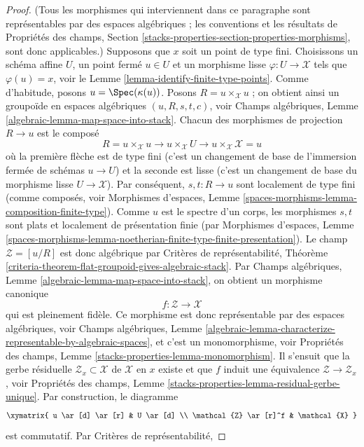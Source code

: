\begin{proof}
(Tous les morphismes qui interviennent dans ce paragraphe sont représentables
par des espaces algébriques ; les conventions et les résultats de
Propriétés des champs,
Section \ref{stacks-properties-section-properties-morphisms},
sont donc applicables.)
Supposons que $x$ soit un point de type fini. Choisissons un schéma affine
$U$, un point fermé $u \in U$ et un morphisme lisse
$\varphi : U \to \mathcal{X}$ tels que $\varphi(u) = x$, voir le
Lemme \ref{lemma-identify-finite-type-points}.
Comme d'habitude, posons $u = \Spec(\kappa(u))$. Posons
$R = u \times_\mathcal{X} u$ ; on obtient ainsi un groupoïde en espaces
algébriques $(u, R, s, t, c)$, voir Champs algébriques,
Lemme \ref{algebraic-lemma-map-space-into-stack}.
Chacun des morphismes de projection $R \to u$ est le composé
$$
R = u \times_\mathcal{X} u \to
u \times_\mathcal{X} U \to
u \times_\mathcal{X} \mathcal{X} = u
$$
où la première flèche est de type fini (c'est un changement de base de
l'immersion fermée de schémas $u \to U$) et la seconde est lisse (c'est un
changement de base du morphisme lisse $U \to \mathcal{X}$). Par conséquent,
$s, t : R \to u$ sont localement de type fini (comme composés, voir
Morphismes d'espaces,
Lemme \ref{spaces-morphisms-lemma-composition-finite-type}).
Comme $u$ est le spectre d'un corps, les morphismes $s, t$ sont plats et localement de
présentation finie (par Morphismes d'espaces, Lemme
\ref{spaces-morphisms-lemma-noetherian-finite-type-finite-presentation}).
Le champ $\mathcal{Z} = [u/R]$ est donc algébrique par Critères de
représentabilité,
Théorème \ref{criteria-theorem-flat-groupoid-gives-algebraic-stack}.
Par Champs algébriques,
Lemme \ref{algebraic-lemma-map-space-into-stack},
on obtient un morphisme canonique
$$
f : \mathcal{Z} \longrightarrow \mathcal{X}
$$
qui est pleinement fidèle. Ce morphisme est donc représentable par des espaces
algébriques, voir Champs algébriques, Lemme
\ref{algebraic-lemma-characterize-representable-by-algebraic-spaces},
et c'est un monomorphisme, voir Propriétés des champs,
Lemme \ref{stacks-properties-lemma-monomorphism}.
Il s'ensuit que la gerbe résiduelle
$\mathcal{Z}_x \subset \mathcal{X}$ de $\mathcal{X}$ en $x$ existe et que
$f$ induit une équivalence $\mathcal{Z} \to \mathcal{Z}_x$, voir
Propriétés des champs,
Lemme \ref{stacks-properties-lemma-residual-gerbe-unique}.
Par construction, le diagramme
$$
\xymatrix{
u \ar[d] \ar[r] & U \ar[d] \\
\mathcal{Z} \ar[r]^f & \mathcal{X}
}
$$
est commutatif. Par Critères de représentabilité,

\end{proof}
